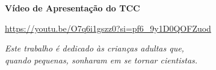 \documentclass[
12pt,
 a4paper,
    english,
    brazil,
    oneside
    ]{abntex2}
\begin{document}

\frenchspacing


\renewcommand{\imprimircapa}{%
	\begin{capa}%
		\center
		{\ABNTEXchapterfont\large\imprimirautor}
		\vspace*{\fill}

		{\ABNTEXchapterfont\bfseries\LARGE\imprimirtitulo}

		\vspace*{5cm}
		\textbf{Vídeo de Apresentação do TCC}

		\href{https://youtu.be/O7q6i1gszz0?si=pf6_9y1D0QOFZuod}{https://youtu.be/O7q6i1gszz0?si=pf6\_9y1D0QOFZuod}
		\vspace*{\fill}

		{\large\imprimirlocal}
		\par
		{\large\imprimirdata}
		\vspace*{1cm}
	\end{capa}
}
\imprimircapa

\imprimirfolhaderosto

\begin{dedicatoria}
	\vspace*{\fill}
	\centering
	\noindent
	\textit{
		Este trabalho é dedicado às crianças adultas que,\\
		quando pequenas, sonharam em se tornar cientistas.\\
	}
\end{dedicatoria}
\end{document}
